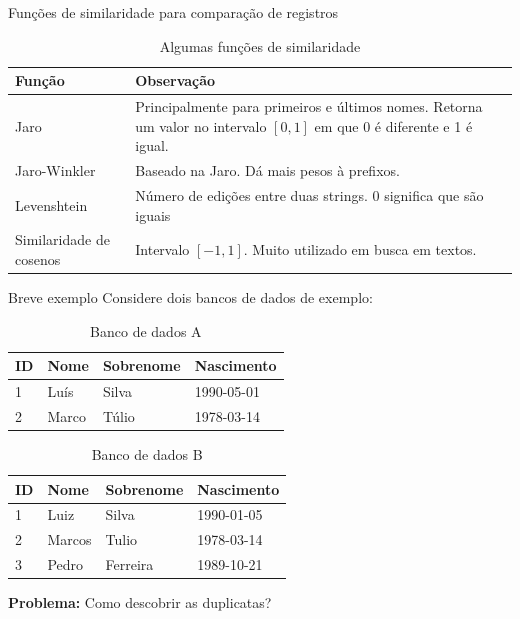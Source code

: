 \documentclass{beamer}
\newcommand\Fontvi{\fontsize{7}{7.2}\selectfont}
\begin{document}
  \begin{frame}{Funções de similaridade para comparação de registros}
      \begin{table}
          \centering
          \caption{Algumas funções de similaridade \cite{survey}}
          \begin{tabularx}{\textwidth}{|l|X|}
              \hline
              Função                    & Observação \\ \hline
              Jaro                      & Principalmente para primeiros e últimos nomes. Retorna um valor no intervalo $[0,1]$ em que 0 é diferente e 1 é igual. \\ \hline
              Jaro-Winkler              & Baseado na Jaro. Dá mais pesos à prefixos. \\ \hline
              Levenshtein               & Número de edições entre duas strings. 0 significa que são iguais\\ \hline
              Similaridade de cosenos   & Intervalo $[-1, 1]$. Muito utilizado em busca em textos. \\ \hline
          \end{tabularx}
      \end{table}
  \end{frame}

  \begin{frame}{Breve exemplo}
      Considere dois bancos de dados de exemplo:
      \Fontvi
      \begin{multicols}{2}
          \begin{table}[]
              \centering
              \caption{Banco de dados A}
              \begin{tabular}{|l|l|l|l|}
                  \hline
                  ID & Nome  & Sobrenome & Nascimento \\ \hline
                  1  & Luís  & Silva     & 1990-05-01 \\
                  2  & Marco & Túlio     & 1978-03-14 \\ \hline
              \end{tabular}
          \end{table}
          \columnbreak
          \begin{table}[]
              \centering
              \caption{Banco de dados B}
              \begin{tabular}{|l|l|l|l|}
                  \hline
                  ID & Nome   & Sobrenome & Nascimento \\ \hline
                  1  & Luiz   & Silva     & 1990-01-05 \\
                  2  & Marcos & Tulio     & 1978-03-14 \\
                  3  & Pedro  & Ferreira  & 1989-10-21 \\ \hline
              \end{tabular}
          \end{table}
      \end{multicols}

      \textbf{Problema:} Como descobrir as duplicatas?
  \end{frame}
\end{document}
